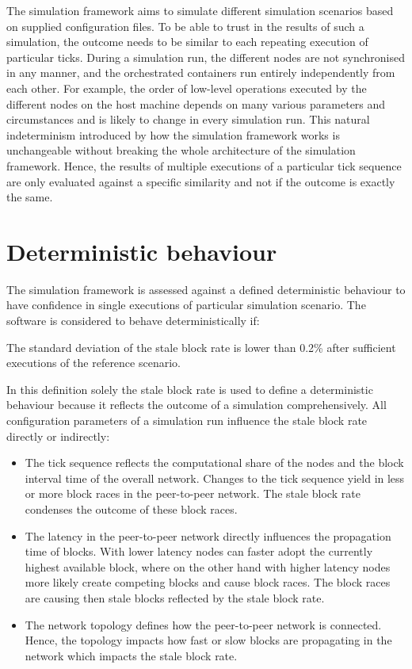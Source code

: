 The simulation framework aims to simulate different simulation scenarios based on supplied configuration files.
To be able to trust in the results of  such a simulation, the outcome needs to be similar to each repeating execution of particular ticks.
During a simulation run, the different nodes are not synchronised in any manner, and the orchestrated containers run entirely independently from each other.
For example, the order of low-level operations executed by the different nodes on the host machine depends on many various parameters and circumstances and is likely to change in every simulation run.
This natural indeterminism introduced by how the simulation framework works is unchangeable without breaking the whole architecture of the simulation framework.
Hence, the results of multiple executions of a particular tick sequence are only  evaluated against a specific similarity and not if the outcome is exactly the same.

\section{Deterministic behaviour} \label{chap:deterministic_behaviour}

The simulation framework is assessed against a defined deterministic behaviour to have confidence in single executions of particular simulation scenario.
The software is considered to behave deterministically if:

The standard deviation of the stale block rate is lower than 0.2\% after sufficient executions of the reference scenario.

In this definition solely the stale block rate is used to define a deterministic behaviour because it reflects the outcome of a simulation comprehensively.
All configuration parameters of a simulation run influence the stale block rate directly or indirectly\cite{gervais2016security}:

\begin{itemize}
	\item The tick sequence reflects the computational share of the nodes and the block interval time of the overall network. Changes to the tick sequence yield in less or more block races in the peer-to-peer network.
	The stale block rate condenses the outcome of these block races.
	\item The latency in the peer-to-peer network directly influences the propagation time of blocks.
	With lower latency nodes can faster adopt the currently highest available block, where on the other hand with higher latency nodes more likely create competing blocks and cause block races.
	The block races are causing then stale blocks reflected by the stale block rate.
	\item The network topology defines how the peer-to-peer network is connected.
	Hence, the topology impacts how fast or slow blocks are propagating in the network which impacts the stale block rate.
\end{itemize}

